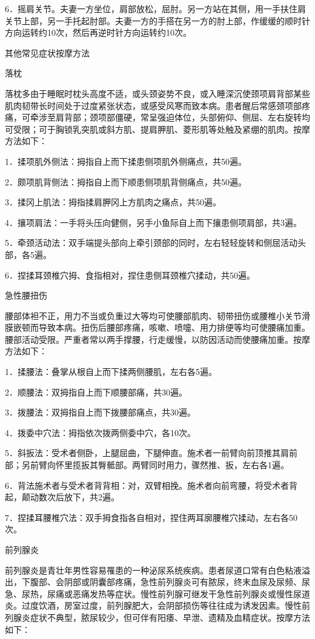 \documentclass[12pt,UTF8]{ctexbook}
\begin{document}
6．摇肩关节。夫妻一方坐位，肩部放松，屈肘。另一方站在其侧，用一手扶住肩关节上部，另一手托起肘部。夫妻一方的手搭在另一方的肘上部，作缓缓的顺时针方向运转约10次，然后再逆时针方向运转约10次。





其他常见症状按摩方法


落枕

落枕多由于睡眠时枕头高度不适，或头颈姿势不良，或入睡深沉使颈项肩背部某些肌肉韧带长时间处于过度紧张状态，或感受风寒而致本病。患者醒后常感颈项部疼痛，可牵涉至肩背部；颈项部僵硬，常呈强迫体位，头部俯仰、侧屈、左右旋转均可受限；可于胸锁乳突肌或斜方肌、提肩胛肌、菱形肌等处触及紧绷的肌肉。按摩方法如下：

1．揉项肌外侧法：拇指自上而下揉患侧项肌外侧痛点，共50遍。

2．颇项肌背侧法：拇指自上而下顺患侧项肌背侧痛点，共50遍。

3．揉冈上肌法：拇指揉肩胛冈上方肌肉之痛点，共50遍。

4．攘项肩法：一手将头压向健侧，另手小鱼际自上而下攘患侧项肩部，共3遍。

5．牵颈活动法：双手端提头部向上牵引颈部的同时，左右轻轻旋转和侧屈活动头部，各5遍。

6．捏揉耳颈椎穴拇、食指相对，捏住患侧耳颈椎穴揉动，共50遍。

急性腰扭伤

腰部体袒不正，用力不当或负重过大等均可使腰部肌肉、韧带扭伤或腰椎小关节滑膜嵌顿而导致本病。扭伤后腰部疼痛，咳嗽、喷嚏、用力排便等均可使腰痛加重。腰部活动受限。严重者常以两手撑腰，行走缓慢，以防因活动而使腰痛加重。按摩方法如下：

1．揉腰法：叠掌从根自上而下揉两侧腰肌，左右各5遍。

2．顺腰法：双拇指自上而下顺腰部痛，共30遍。

3．拨腰法：双拇指自上而下拨腰部痛点，共30遍。

4．拨委中穴法：拇指依次拨两侧委中穴，各10次。

5．斜扳法：受术者侧卧，上腿屈曲，下腿伸直。施术者一前臂向前顶推其肩前部；另前臂向怀里揽扳其臀骶部。两臂同时用力，骤然推、扳，左右各1遍。

6．背法施术者与受术者背背相：对，双臂相挽。施术者向前弯腰，将受术者背起，颠动数次后放下，共2遍。

7．捏揉耳腰椎穴法：双手拇食指各自相对，捏住两耳廓腰椎穴揉动，左右各50次。

前列腺炎

前列腺炎是青壮年男性容易罹患的一种泌尿系统疾病。患者尿道口常有白色粘液溢出，下腹部、会阴部或阴囊部疼痛，急性前列腺炎可有脓尿，终末血尿及尿频、尿急、尿热，尿痛或恶痛发热等症状。慢性前列腺可继发干急性前列腺炎或慢性尿道炎。过度饮酒，房室过度，前列腺肥大，会阴部损伤等往往成为诱发因素。慢性前列腺炎症状不典型，脓尿较少，但可伴有阳痿、早泄、遗精及血精症状。按摩方法如下：
\end{document}
